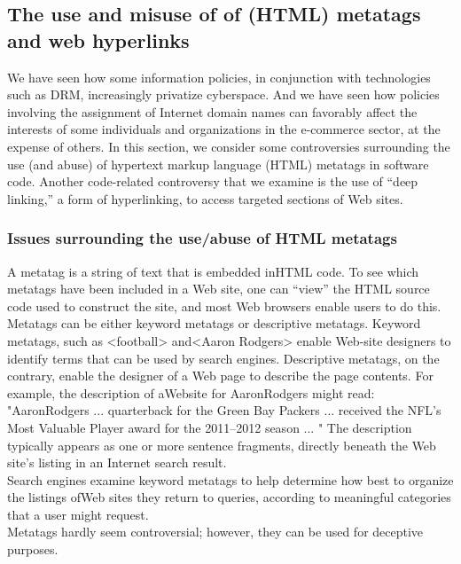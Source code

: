 \documentclass[12pt]{article}
\theoremstyle{definition}
\begin{document}
\subsection{The use and misuse of of (HTML) metatags and web hyperlinks}
We have seen how some information policies, in conjunction with technologies such as
DRM, increasingly privatize cyberspace. And we have seen how policies involving the
assignment of Internet domain names can favorably affect the interests of some
individuals and organizations in the e-commerce sector, at the expense of others. In
this section, we consider some controversies surrounding the use (and abuse) of
hypertext markup language (HTML) metatags in software code. Another code-related
controversy that we examine is the use of “deep linking,” a form of hyperlinking, to
access targeted sections of Web sites.
\subsubsection{Issues surrounding the use/abuse of HTML metatags}
A metatag is a string of text
that is embedded inHTML code. To see which metatags have been included in a Web site,
one can “view” the HTML source code used to construct the site, and most Web browsers
enable users to do this. Metatags can be either keyword metatags or descriptive metatags.
Keyword metatags, such as <football> and<Aaron Rodgers> enable Web-site designers
to identify terms that can be used by search engines. Descriptive metatags, on the contrary,
enable the designer of a Web page to describe the page contents. For example, the
description of aWebsite for AaronRodgers might read: "AaronRodgers ... quarterback
for the Green Bay Packers ... received the NFL’s Most Valuable Player award for the
2011–2012 season ... " The description typically appears as one or more sentence
fragments, directly beneath the Web site’s listing in an Internet search result.\\
Search engines examine keyword metatags to help determine how best to organize
the listings ofWeb sites they return to queries, according to meaningful categories that a
user might request. \\
Metatags hardly seem controversial; however, they can be used for deceptive purposes.\\
\end{document}
